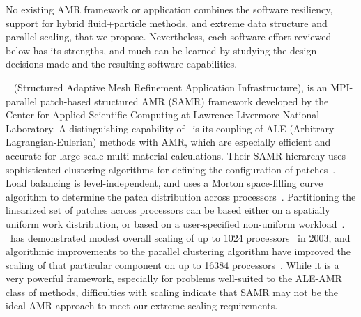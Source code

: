 \documentclass[11pt,letterpaper]{article}
\begin{document}
No existing AMR framework or application combines the software
resiliency, support for hybrid fluid+particle methods, and extreme
data structure and parallel scaling, that
we propose.  Nevertheless,
each software effort reviewed below has its strengths, and much
can be learned by studying the design decisions made and the resulting
software capabilities.


\SUBSUBSECTION{\samrai}
%
\samrai~\cite{wwwsamraicode,WiHo01} (Structured Adaptive Mesh
Refinement Application Infrastructure), is an MPI-parallel patch-based
structured AMR (SAMR) framework developed by the Center for Applied
Scientific Computing at Lawrence Livermore National Laboratory.  A
distinguishing capability of \samrai\ is its coupling of ALE
(Arbitrary Lagrangian-Eulerian) methods with AMR, which are especially
efficient and accurate for large-scale multi-material calculations.
Their SAMR hierarchy uses sophisticated clustering algorithms for
defining the configuration of patches~\cite{GuWi06}.  Load balancing
is level-independent, and uses a Morton space-filling curve algorithm
to determine the patch distribution across processors~\cite{WiHo01}.
Partitioning the linearized set of patches across processors can be
based either on a spatially uniform work distribution, or based on a
user-specified non-uniform workload~\cite{wwwsamraicode}.  \samrai\
has demonstrated modest overall scaling of up to 1024
processors~\cite{WiHy03} in 2003, and algorithmic improvements to the
parallel clustering algorithm have improved the scaling of that
particular component on up to 16384 processors~\cite{GuWi06}.  While
it is a very powerful framework, especially for problems well-suited
to the ALE-AMR class of methods, difficulties with scaling indicate that
SAMR may not be the ideal AMR approach to meet our
extreme scaling requirements.

\end{document}
